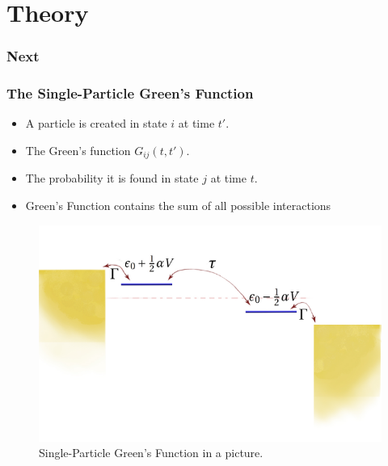 \section{Theory}
\begin{frame}
    \frametitle{Next}
\end{frame}
\begin{frame}
    \frametitle{The Single-Particle Green's Function}
     \begin{itemize}
     \item A particle is created in state $i$ at time $t'$.
     \item The Green's function $G_{ij}(t,t')$.
     \item The probability it is found in state $j$ at time $t$.
     \item Green's Function contains the sum of all possible interactions
     \end{itemize}
    
    \begin{figure}[!b] 
        \centering
        \includegraphics[height=0.5\textheight]{fig/non_interacting_schematics.pdf}
        \caption{Single-Particle Green's Function in a picture.}
    \end{figure} 
\end{frame} 
